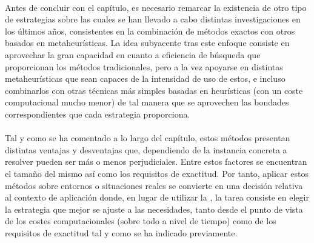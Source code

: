 \documentclass{subfiles}
\begin{document}
      \paragraph{}
      Antes de concluir con el capítulo, es necesario remarcar la existencia de otro tipo de estrategias sobre las cuales se han llevado a cabo distintas investigaciones en los últimos años, consistentes en la combinación de métodos exactos con otros basados en metaheurísticas. La idea subyacente tras este enfoque consiste en aprovechar la gran capacidad en cuanto a eficiencia de búsqueda que proporcionan los métodos tradicionales, pero a la vez apoyarse en distintas metaheurísticas que sean capaces de  la intensidad de uso de estos, e incluso combinarlos con otras técnicas más simples basadas en heurísticas (con un coste computacional mucho menor) de tal manera que se aprovechen las bondades correspondientes que cada estrategia proporciona.

      \paragraph{}
      Tal y como se ha comentado a lo largo del capítulo, estos métodos presentan distintas ventajas y desventajas que, dependiendo de la instancia concreta a resolver pueden ser más o menos perjudiciales. Entre estos factores se encuentran el tamaño del mismo así como los requisitos de exactitud. Por tanto, aplicar estos métodos sobre entornos o situaciones reales se convierte en una decisión relativa al contexto de aplicación donde, en lugar de utilizar la , la tarea consiste en elegir la estrategia que mejor se ajuste a las necesidades, tanto desde el punto de vista de los costes computacionales (sobre todo a nivel de tiempo) como de los requisitos de exactitud tal y como se ha indicado previamente.
\end{document}
